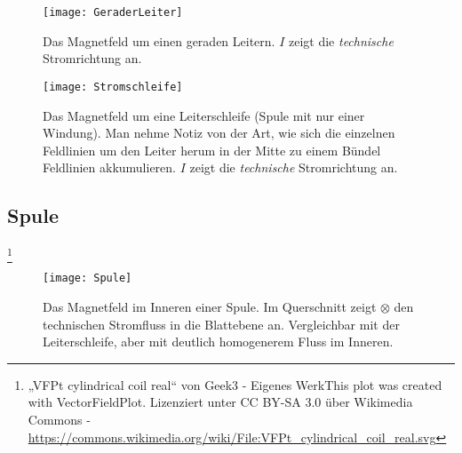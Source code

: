 \begin{figure}[ht!]
	\centering
	\begin{minipage}[b]{0.4\linewidth}
   	\texttt{[image: GeraderLeiter]}
		\caption{Das Magnetfeld um einen geraden Leitern. $I$ zeigt die \emph{technische} Stromrichtung an.}
	\end{minipage}
	\quad
	\begin{minipage}[b]{0.4\linewidth}
    	\texttt{[image: Stromschleife]}
	\caption{Das Magnetfeld um eine Leiterschleife (Spule mit nur einer Windung). Man nehme Notiz von der Art, wie sich die einzelnen Feldlinien um den Leiter herum in der Mitte zu einem Bündel Feldlinien akkumulieren. $I$ zeigt die \emph{technische} Stromrichtung an.}
	\end{minipage}
\end{figure}

\newpage

\subsection{Spule} \label{subsec:MFeldSpule}
\footnote{„VFPt cylindrical coil real“ von Geek3 - Eigenes WerkThis plot was created with VectorFieldPlot. Lizenziert unter CC BY-SA 3.0 über Wikimedia Commons - \url{https://commons.wikimedia.org/wiki/File:VFPt_cylindrical_coil_real.svg}}
\label{subsec:Spule}

\hfill

\begin{figure}[ht!]
	\centering
   	\texttt{[image: Spule]}
		\caption{Das Magnetfeld im Inneren einer Spule. Im Querschnitt zeigt $\otimes$ den technischen Stromfluss in die Blattebene an. Vergleichbar mit der Leiterschleife, aber mit deutlich homogenerem Fluss im Inneren.}
\end{figure}



